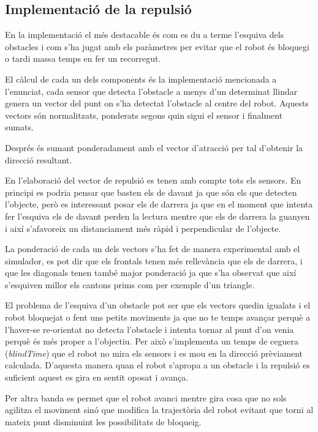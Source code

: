 \subsection{Implementació de la repulsió}

En la implementació el més destacable és com es du a terme l'esquiva dels obstacles i com s'ha jugat amb
els paràmetres per evitar que el robot és bloquegi o tardi massa temps en fer un recorregut. 

El càlcul de cada un dels components és la implementació mencionada a l'enunciat, cada sensor que
detecta l'obstacle a menys d'un determinat llindar genera un vector del punt on s'ha detectat l'obstacle
al centre del robot. Aquests vectors són normalitzats, ponderats segons quin sigui el sensor i finalment
sumats.

Després és sumant ponderadament amb el vector d'atracció per tal d'obtenir la direcció resultant.

En l'elaboració del vector de repulsió es tenen amb compte tots els sensors. En principi es podria pensar
que basten els de davant ja que són els que detecten l'objecte, però es interessant posar els de darrera
ja que en el moment que intenta fer l'esquiva els de davant perden la lectura mentre que els de darrera
la guanyen i així s'afavoreix un distanciament més ràpid i perpendicular de l'objecte. 

La ponderació de cada un dels vectors s'ha fet de manera experimental amb el simulador, es pot dir
que els frontals tenen més rellevància que els de darrera, i que les diagonals tenen també major
ponderació ja que s'ha observat que així s'esquiven millor els cantons prims com per exemple d'un triangle.

El problema de l'esquiva d'un obstacle pot ser que els vectors quedin igualats i el robot bloquejat
o fent uns petits moviments ja que no te temps avançar perquè a l'haver-se re-orientat no detecta l'obstacle
i intenta  tornar al punt d'on venia perquè és més proper a l'objectiu. Per això s'implementa un temps de
ceguera (\emph{blindTime}) que el robot no mira els sensors i es mou en la direcció prèviament calculada.
D'aquesta manera quan el robot s'apropa a un obstacle i la repulsió es suficient aquest es gira en sentit
oposat i avança.

Per altra banda es permet que el robot avanci mentre gira cosa que no sols agilitza el moviment sinó que
modifica la trajectòria del robot evitant que torni al mateix punt disminuint les possibilitats de bloqueig.

